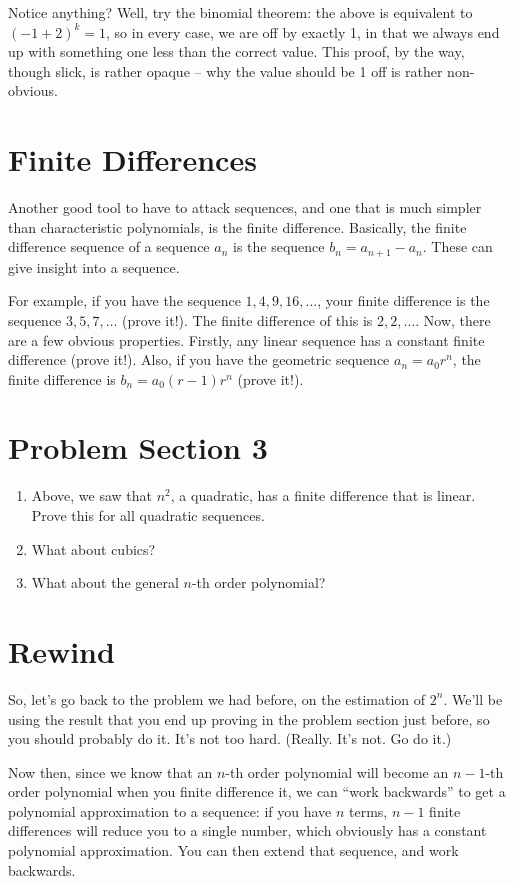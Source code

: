 \documentclass[12pt,letterpaper]{article}
\begin{document}
Notice anything? Well, try the binomial theorem: the above is equivalent to $(-1 + 2) ^ k = 1$,
so in every case, we are off by exactly 1, in that we always end up with something one less
than the correct value. This proof, by the way, though slick, is
rather opaque -- why the value should be 1 off is rather non-obvious.

\section{Finite Differences}
Another good tool to have to attack sequences, and one that is much
simpler than characteristic polynomials, is the finite difference.
Basically, the finite difference sequence of a sequence $a_n$ is the
sequence $b_n = a_{n+1} - a_n$. These can give insight into a
sequence.

For example, if you have the sequence $1, 4, 9, 16, \ldots$, your
finite difference is the sequence $3, 5, 7, \ldots$ (prove it!).
The finite difference of this is $2, 2, \ldots$. Now, there are
a few obvious properties. Firstly, any linear sequence has a
constant finite difference (prove it!). Also, if you have the
geometric sequence $a_n = a_0 r^n$, the finite difference is
$b_n = a_0 (r-1) r^n$ (prove it!).

\section{Problem Section 3}
\begin{enumerate}
\item Above, we saw that $n^2$, a quadratic, has a finite difference
that is linear. Prove this for all quadratic sequences.
\item What about cubics?
\item What about the general $n$-th order polynomial?
\end{enumerate}

\section{Rewind}
So, let's go back to the problem we had before, on the estimation of
$2^n$. We'll be using the result that you end up proving in the
problem section just before, so you should probably do it. It's not
too hard. (Really. It's not. Go do it.)

Now then, since we know that an $n$-th order polynomial will become
an $n-1$-th order polynomial when you finite difference it, we can
``work backwards'' to get a polynomial approximation to a sequence: if
you have $n$ terms, $n-1$ finite differences will reduce you to a
single number, which obviously has a constant polynomial
approximation. You can then extend that sequence, and work backwards.
\end{document}
